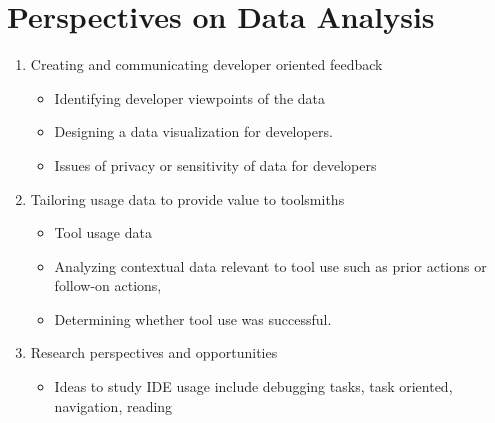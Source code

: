 \section{ Perspectives on Data Analysis}


\begin{enumerate}
\item Creating and communicating developer oriented feedback
\begin{itemize}
	\item
	Identifying developer viewpoints of the data
	\item
	Designing a data visualization for developers. 
	\item
	Issues of privacy or sensitivity of data for developers
\end{itemize}
\item Tailoring usage data to provide value to toolsmiths
\begin{itemize}
	\item 
	Tool usage data
	\item 
	Analyzing contextual data relevant to tool use such as prior actions or follow-on actions, 
	\item 
	Determining whether tool use was successful.
\end{itemize}
\item Research perspectives and opportunities
\begin{itemize}
	\item
	Ideas to study IDE usage include debugging tasks, task oriented, navigation, reading
\end{itemize}

\end{enumerate}